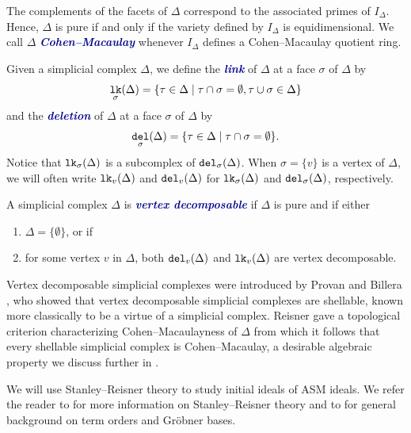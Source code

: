 \documentclass[12 pt]{amsart}
\DeclareMathOperator{\del}{{\tt del}}
\DeclareMathOperator{\lk}{{\tt lk}}
\theoremstyle{plain}
\theoremstyle{definition}
\theoremstyle{remark}
\newcommand{\newword}[1]{\textcolor{darkblue}{\textbf{\emph{#1}}}}
\begin{document}
The complements of the facets of $\Delta$ correspond to the associated primes of $I_\Delta$.  Hence, $\Delta$ is pure if and only if the variety defined by $I_\Delta$ is equidimensional.  We call $\Delta$ \newword{Cohen--Macaulay} whenever $I_\Delta$ defines a Cohen--Macaulay quotient ring.

Given a simplicial complex $\Delta$, we define the \newword{link} of $\Delta$ at a face $\sigma$ of $\Delta$ by \[
\lk_{\sigma}(\Delta) = \{\tau \in \Delta \mid \tau \cap \sigma = \emptyset, \tau \cup \sigma \in \Delta\}
\] and the \newword{deletion} of $\Delta$ at a face $\sigma$ of $\Delta$ by \[
\del_\sigma(\Delta) = \{\tau \in \Delta \mid \tau \cap \sigma = \emptyset\}.
\]  Notice that $\lk_\sigma(\Delta)$ is a subcomplex of $\del_{\sigma}(\Delta)$.  When $\sigma = \{v\}$ is a vertex of $\Delta$, we will often write $\lk_{v}(\Delta)$ and $\del_{v}(\Delta)$ for $\lk_{\sigma}(\Delta)$ and $\del_{\sigma}(\Delta)$, respectively.

A simplicial complex $\Delta$ is \newword{vertex decomposable} if $\Delta$ is pure and if either
    \begin{enumerate}
        \item $\Delta = \{\emptyset\}$, or if
        \item for some vertex $v$ in $\Delta$, both $\del_{v}(\Delta)$ and $\lk_{v}(\Delta)$ are vertex decomposable.
    \end{enumerate}

Vertex decomposable simplicial complexes were introduced by Provan and Billera \cite{PB80}, who showed that vertex decomposable simplicial complexes are shellable, known more classically to be a virtue of a simplicial complex.  Reisner \cite{Rei76} gave a topological criterion characterizing Cohen--Macaulayness of $\Delta$ from which it follows that every shellable simplicial complex is Cohen--Macaulay, a desirable algebraic property we discuss further in .

We will use Stanley--Reisner theory to study initial ideals of ASM ideals. We refer the reader to \cite[Chapter 1]{miller-sturmfels} for more information on Stanley--Reisner theory and to \cite[Chapter 15]{Eis95} for general background on term orders and Gr\"obner bases.
\end{document}
